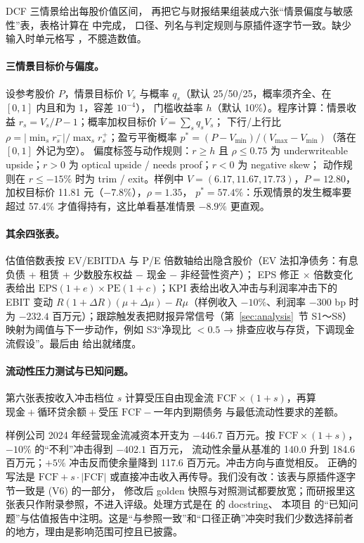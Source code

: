 DCF 三情景给出每股价值区间， 再把它与财报结果组装成六张“情景偏度与敏感性”表，表格计算在  中完成，
口径、列名与判定规则与原插件逐字节一致。缺少输入时单元格写 ，不臆造数值。

\paragraph{三情景目标价与偏度。} 设参考股价 $P$，情景目标价 $V_s$ 与概率 $q_s$（默认 25/50/25，概率须齐全、在 $[0,1]$ 内且和为 1，容差 $10^{-4}$），
门槛收益率 $h$（默认 10\%）。程序计算：情景收益 $r_s=V_s/P-1$；概率加权目标价 $\bar V=\sum_s q_sV_s$；
下行/上行比 $\rho=|\min_s r_s^-|/\max_s r_s^+$；盈亏平衡概率 $p^\ast=(P-V_{\min})/(V_{\max}-V_{\min})$（落在 $[0,1]$ 外记为空）。
偏度标签与动作规则：$r\ge h$ 且 $\rho\le0.75$ 为 underwriteable upside；$r>0$ 为 optical upside / needs proof；$r<0$ 为 negative skew；
动作规则在 $r\le-15\%$ 时为 trim / exit。样例中 $V=(6.17,11.67,17.73)$，$P=12.80$，加权目标价 11.81 元（$-7.8\%$），$\rho=1.35$，
$p^\ast=57.4\%$：乐观情景的发生概率要超过 57.4\% 才值得持有，这比单看基准情景 $-8.9\%$ 更直观。

\paragraph{其余四张表。} 估值倍数表按 EV/EBITDA 与 P/E 倍数轴给出隐含股价（EV 法扣净债务：有息负债 + 租赁 + 少数股东权益 − 现金 − 非经营性资产）；
EPS 修正 × 倍数变化表给出 $\text{EPS}(1+e)\times\text{PE}(1+c)$；KPI 表给出收入冲击与利润率冲击下的 EBIT 变动
$R(1+\Delta R)(\mu+\Delta\mu)-R\mu$（样例收入 $-10\%$、利润率 $-300$ bp 时为 $-232.4$ 百万元）；跟踪触发表把财报异常信号（第~\ref{sec:analysis}~节 S1～S8）
映射为阈值与下一步动作，例如 S3“净现比 $<0.5$ → 排查应收与存货，下调现金流假设”。最后由  给出就绪度。

\paragraph{流动性压力测试与已知问题。} 第六张表按收入冲击档位 $s$ 计算受压自由现金流 $\text{FCF}\times(1+s)$，再算
$\text{现金}+\text{循环贷余额}+\text{受压 FCF}-\text{一年内到期债务}$ 与最低流动性要求的差额。

\begin{failcase}
样例公司 2024 年经营现金流减资本开支为 $-446.7$ 百万元。按 $\text{FCF}\times(1+s)$，$-10\%$ 的“不利”冲击得到 $-402.1$ 百万元，
流动性余量从基准的 140.0 升到 184.6 百万元；$+5\%$ 冲击反而使余量降到 117.6 百万元。冲击方向与直觉相反。
正确的写法是 $\text{FCF}+s\cdot|\text{FCF}|$ 或直接冲击收入再传导。我们没有改：该表与原插件逐字节一致是 (V6) 的一部分，
修改后 golden 快照与对照测试都要放宽；而研报里这张表只作附录参照，不进入评级。处理方式是在  的 docstring、
本项目  的“已知问题”与估值报告中注明。这是“与参照一致”和“口径正确”冲突时我们少数选择前者的地方，理由是影响范围可控且已披露。
\end{failcase}

